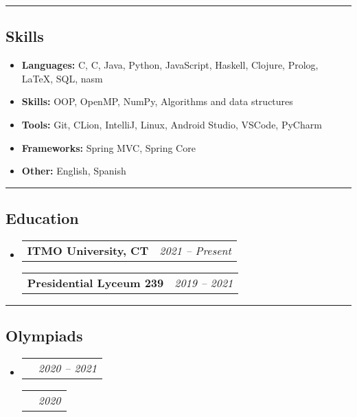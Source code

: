 \documentclass[11pt,letterpaper]{article}
\makeatletter
\newcommand{\headerrow}[2]
{\begin{tabular*}{\linewidth}{l@{\extracolsep{\fill}}r}
#1 &
#2 \\
\end{tabular*}}
\newcommand{\CPP}
{C\nolinebreak[4]\hspace{-.05em}\raisebox{.22ex}{\footnotesize\bf ++}}
\makeatother
\begin{document}
\hrule
\vspace{-1em}
\subsection*{\Large Skills}

\begin{itemize}[leftmargin=1em,noitemsep]
	\item \textbf{Languages:}
	      C, \CPP, Java, Python, JavaScript, Haskell, Clojure, Prolog, \LaTeX, SQL, nasm
	\item \textbf{Skills:}
	      OOP, OpenMP, NumPy, Algorithms and data structures
	\item \textbf{Tools:}
	      Git, CLion, IntelliJ, Linux, Android Studio, VSCode, PyCharm
    \item \textbf{Frameworks:}
          Spring MVC, Spring Core
    \item \textbf{Other:}
          English, Spanish
\end{itemize}

\hrule
\vspace{-1em}
\subsection*{\Large Education}

\begin{itemize}[leftmargin=1em]
	\parskip=0.1em
		
	\item
	      \headerrow
	      {\textbf{ITMO University, CT}}
	      {\emph{2021 -- Present}}
	      \headerrow
	      {\textbf{Presidential Lyceum 239}}
	      {\emph{2019 -- 2021}}
	      	      
\end{itemize}

\hrule
\vspace{-1em}
\subsection*{\Large Olympiads}

\begin{itemize}[leftmargin=1em]
	\parskip=0.1em
		
	\item
	      \headerrow
	      {\text{Winner of the regional stage in computer science}}
	      {\emph{2020 -- 2021}}
	      
	      \headerrow
	      {\text{Winner of the Olympiad cognitive technologies}}
	      {\emph{2020}}
	      	      
\end{itemize}
\end{document}
